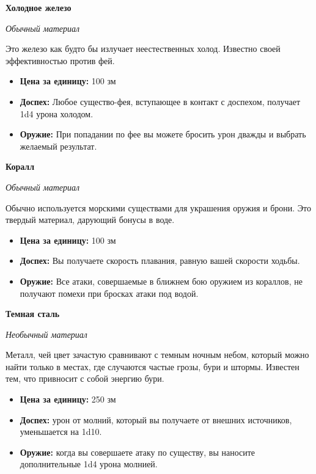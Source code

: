 \documentclass[a4paper, 9pt, twocolumn]{book}
\begin{document}
	\noindent  \textbf{Холодное железо}
	
	\noindent \textit{Обычный материал}
	
	\smallskip
	
	\noindent Это железо как будто бы излучает неестественных холод. Известно своей эффективностью против фей.
	
	\begin{itemize}
		\item \textbf{Цена за единицу:} 100 зм
		
		\item \textbf{Доспех:} Любое существо-фея, вступающее в контакт с доспехом, получает 1d4 урона холодом.
		
		\item \textbf{Оружие:} При попадании по фее вы можете бросить урон дважды и выбрать желаемый результат.
	\end{itemize}

	\noindent \textbf{Коралл}
	
	\noindent \textit{Обычный материал}
	
	\smallskip
	
	\noindent Обычно используется морскими существами для украшения оружия и брони. Это твердый материал, дарующий бонусы в воде.
	
	\begin{itemize}
		\item \textbf{Цена за единицу:} 100 зм
		
		\item \textbf{Доспех:} Вы получаете скорость плавания, равную вашей скорости ходьбы.
		
		\item \textbf{Оружие:} Все атаки, совершаемые в ближнем бою оружием из кораллов, не получают помехи при бросках атаки под водой.
	\end{itemize}

	\noindent \textbf{Темная сталь}
	
	\noindent \textit{Необычный материал}
	
	\smallskip 
	
	\noindent Металл, чей цвет зачастую сравнивают с темным ночным небом, который можно найти только в местах, где случаются частые грозы, бури и штормы. Известен тем, что привносит с собой энергию бури.
	
	\begin{itemize}
		\item \textbf{Цена за единицу:} 250 зм
		
		\item \textbf{Доспех:} урон от молний, который вы получаете от внешних источников, уменьшается на 1d10.
		
		\item \textbf{Оружие:} когда вы совершаете атаку по существу, вы наносите дополнительные 1d4 урона молнией.
	\end{itemize}
\end{document}
